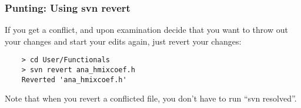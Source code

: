 \subsubsection{Punting: Using svn revert}
If you get a conflict, and upon examination decide that you want to throw
out your changes and start your edits again, just revert your changes:
\begin{verbatim}
    > cd User/Functionals
    > svn revert ana_hmixcoef.h
    Reverted 'ana_hmixcoef.h'
\end{verbatim}
Note that when you revert a conflicted file, you don't have to run
``svn resolved''.

